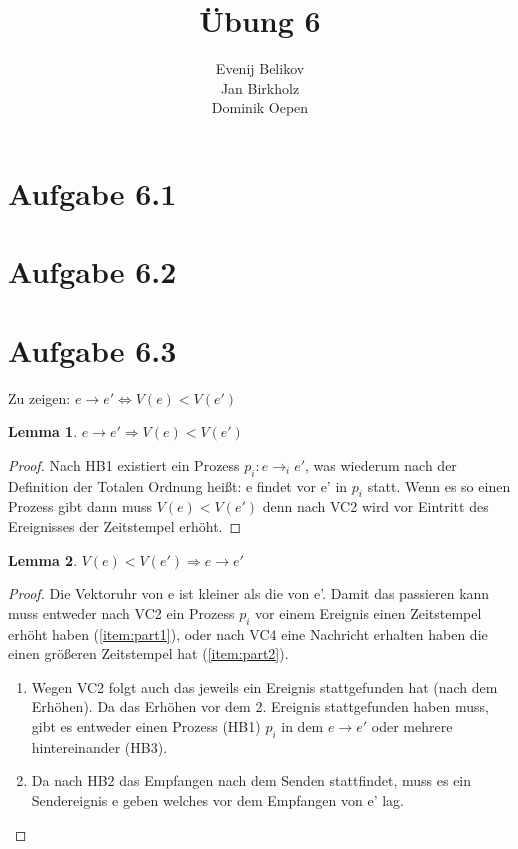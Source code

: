 \documentclass{scrartcl}
\newtheorem{lem}{Lemma}
\begin{document}
\title{Übung 6}
\author{Evenij Belikov\\Jan Birkholz\\Dominik Oepen}
\maketitle

\section*{Aufgabe 6.1}

\section*{Aufgabe 6.2}

\section*{Aufgabe 6.3}
Zu zeigen: $ e \rightarrow e' \Longleftrightarrow  V(e) < V(e') $

\begin{lem}\label{lem:1}
$ e \rightarrow e' \Longrightarrow  V(e) < V(e') $
\end{lem}

\begin{proof}
Nach HB1 existiert ein Prozess $ p_{i}: e \rightarrow_{i} e' $, was wiederum nach der Definition der Totalen Ordnung heißt: e findet vor e' in $ p_{i} $ statt.
Wenn es so einen Prozess gibt dann muss $V(e) < V(e')$ denn nach VC2 wird vor Eintritt des Ereignisses der Zeitstempel erhöht.
\end{proof}

\begin{lem}\label{lem:2}
$V(e) < V(e') \Longrightarrow e \rightarrow e' $
\end{lem}

\begin{proof}
Die Vektoruhr von e ist kleiner als die von e'. Damit das passieren kann muss entweder nach VC2 ein Prozess $p_{i}$ vor einem Ereignis einen Zeitstempel erhöht haben (\ref{item:part1}), oder nach VC4 eine Nachricht erhalten haben die einen größeren Zeitstempel hat (\ref{item:part2}).
\begin{enumerate}
\item \label{item:part1} Wegen VC2 folgt auch das jeweils ein Ereignis stattgefunden hat (nach dem Erhöhen). Da das Erhöhen vor dem 2. Ereignis stattgefunden haben muss, gibt es entweder einen Prozess (HB1) $p_{i}$ in dem $e \rightarrow e'$ oder mehrere hintereinander (HB3).
\item \label{item:part2} Da nach HB2 das Empfangen nach dem Senden stattfindet, muss es ein Sendereignis e geben welches vor dem Empfangen von e' lag.
\end{enumerate}
\end{proof}
\end{document}
